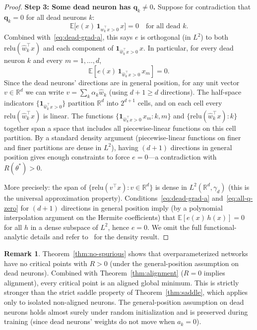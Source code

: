 \documentclass[11pt]{amsart}
\theoremstyle{definition}
\newtheorem{remark}[theorem]{Remark}
\newcommand{\R}{\mathbb{R}}
\newcommand{\E}{\mathbb{E}}
\newcommand{\relu}{\mathrm{relu}}
\begin{document}
\begin{proof}
\medskip
\noindent\textbf{Step 3: Some dead neuron has $\mathbf{q}_k \neq 0$.}
Suppose for contradiction that $\mathbf{q}_k = 0$ for all dead neurons $k$:
\begin{equation}\label{eq:all-q-zero}
  \E\bigl[e(x)\,\mathbf{1}_{\hat{w}_k^\top x > 0}\,x\bigr] = 0
  \quad \text{for all dead } k.
\end{equation}
Combined with~\eqref{eq:dead-grad-a}, this says $e$ is orthogonal (in $L^2$)
to both $\relu(\hat{w}_k^\top x)$ and each component of
$\mathbf{1}_{\hat{w}_k^\top x > 0}\,x$.  In particular, for every dead neuron
$k$ and every $m = 1, \ldots, d$,
\[
  \E[e(x)\,\mathbf{1}_{\hat{w}_k^\top x > 0}\,x_m] = 0.
\]
Since the dead neurons' directions are in general position, for any unit
vector $v \in \R^d$ we can write $v = \sum_k \alpha_k \hat{w}_k$ (using
$d+1 \geq d$ directions).  The half-space indicators
$\{\mathbf{1}_{\hat{w}_k^\top x > 0}\}$ partition $\R^d$ into $2^{d+1}$
cells, and on each cell every $\relu(\hat{w}_k^\top x)$ is linear.  The
functions $\{\mathbf{1}_{\hat{w}_k^\top x > 0}\,x_m : k, m\}$ and
$\{\relu(\hat{w}_k^\top x) : k\}$ together span a space that includes all
piecewise-linear functions on this cell partition.  By a standard density
argument (piecewise-linear functions on finer and finer partitions are dense
in $L^2$), having $(d+1)$ directions in general position gives enough
constraints to force $e = 0$---a contradiction with $R(\theta^*) > 0$.

More precisely: the span of $\{\relu(v^\top x) : v \in \R^d\}$ is dense in
$L^2(\R^d, \gamma_d)$ (this is the universal approximation property).
Conditions~\eqref{eq:dead-grad-a} and~\eqref{eq:all-q-zero} for $(d+1)$
directions in general position imply (by a polynomial interpolation
argument on the Hermite coefficients) that $\E[e(x)\,h(x)] = 0$ for all
$h$ in a dense subspace of $L^2$, hence $e = 0$.  We omit the full
functional-analytic details and refer to~\cite{pinkus1999} for the density
result.
\end{proof}

\begin{remark}\label{rem:general-saddle}
Theorem~\ref{thm:no-spurious} shows that overparameterized networks have no
critical points with $R > 0$ (under the general-position assumption on dead
neurons).  Combined with Theorem~\ref{thm:alignment} ($R = 0$ implies
alignment), every critical point is an aligned global minimum.  This is
strictly stronger than the strict saddle property of
Theorem~\ref{thm:saddle}, which applies only to isolated non-aligned neurons.
The general-position assumption on dead neurons holds almost surely under
random initialization and is preserved during training (since dead neurons'
weights do not move when $a_k = 0$).
\end{remark}
\end{document}
